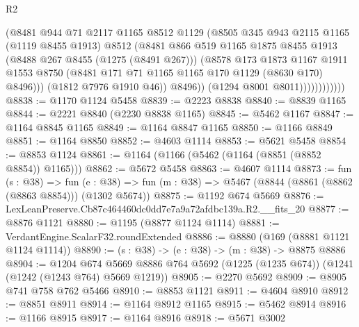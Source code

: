 \begin{lexlean}{R2}
\begin{coremodule}
                            (@8481
                              @944
                              @71
                              @2117
                              @1165
                              @8512
                              @1129
                              (@8505
                                @345
                                @943
                                @2115
                                @1165
                                (@1119 @8455 @1913)
                                @8512
                                (@8481
                                  @866
                                  @519
                                  @1165
                                  @1875
                                  @8455
                                  @1913
                                  (@8488 @267 @8455 (@1275 (@8491 @267)))
                                  (@8578
                                    @173
                                    @1873
                                    @1167
                                    @1911
                                    @1553
                                    @8750
                                    (@8481 @171 @71 @1165 @1165 @170 @1129 (@8630 @170) @8496)))
                                (@1812 @7976 @1910 @46))
                              @8496))
                          (@1294 @8001 @8011))))))))))))
@8838 := @1170 @1124 @5458
@8839 := @2223 @8838
@8840 := @8839 @1165
@8844 := @2221 @8840 (@2230 @8838 @1165)
@8845 := @5462 @1167
@8847 := @1164 @8845 @1165
@8849 := @1164 @8847 @1165
@8850 := @1166 @8849
@8851 := @1164 @8850
@8852 := @4603 @1114
@8853 := @5621 @5458
@8854 := @8853 @1124
@8861 := @1164 (@1166 (@5462 (@1164 (@8851 (@8852 @8854)) @1165)))
@8862 := @5672 @5458
@8863 := @4607 @1114
@8873 := fun (s : @38) =>
  fun (e : @38) => fun (m : @38) => @5467 (@8844 (@8861 (@8862 (@8863 @8854))) (@1302 @5674))
@8875 := @1192 @674 @5669
@8876 := LexLeanPreserve.Cb87c464460dc0dd7e7a9a72afdbc139a.R2.__fits_20
@8877 := @8876 @1121
@8880 := @1195 (@8877 @1124 @1114)
@8881 := VerdantEngine.ScalarF32.roundExtended
@8886 := @8880 (@169 (@8881 @1121 @1124 @1114))
@8890 := (s : @38) -> (e : @38) -> (m : @38) -> @8875 @8886
@8904 := @1204
    @674
    @5669
    @8886
    @764
    @5692
    (@1225 (@1235 @674))
    (@1241 (@1242 (@1243 @764) @5669 @1219))
@8905 := @2270 @5692
@8909 := @8905 @741 @758 @762 @5466
@8910 := @8853 @1121
@8911 := @4604 @8910
@8912 := @8851 @8911
@8914 := @1164 @8912 @1165
@8915 := @5462 @8914
@8916 := @1166 @8915
@8917 := @1164 @8916
@8918 := @5671 @3002

\end{coremodule}
\end{lexlean}
